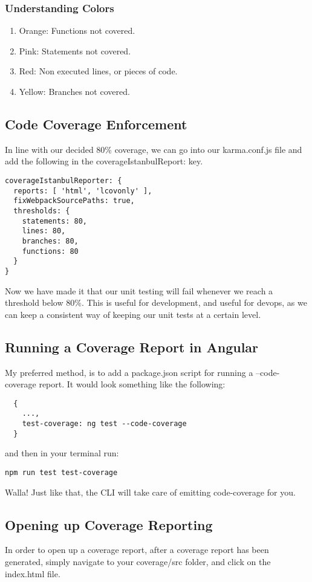 \subsubsection{Understanding Colors}
\begin{enumerate}
  \item Orange: Functions not covered.
  \item Pink: Statements not covered.
  \item Red: Non executed lines, or pieces of code.
  \item Yellow: Branches not covered.
\end{enumerate}

\subsection{ Code Coverage Enforcement }
In line with our decided 80\% coverage, we can go into our karma.conf.js file
and add the following in the coverageIstanbulReport: key.
\begin{lstlisting}
coverageIstanbulReporter: {
  reports: [ 'html', 'lcovonly' ],
  fixWebpackSourcePaths: true,
  thresholds: {
    statements: 80,
    lines: 80,
    branches: 80,
    functions: 80
  }
}
\end{lstlisting}
Now we have made it that our unit testing will fail whenever we reach a
threshold below 80\%. This is useful for development, and useful for devops, as
we can keep a consistent way of keeping our unit tests at a certain level.

\subsection{ Running a Coverage Report in Angular }
My preferred method, is to add a package.json script for running a
--code-coverage report. It would look something like the following:
\begin{verbatim}
  {
    ...,
    test-coverage: ng test --code-coverage
  }
\end{verbatim}

and then in your terminal run:
\begin{verbatim}
npm run test test-coverage
\end{verbatim}

Walla! Just like that, the CLI will take care of emitting code-coverage for you.

\subsection{ Opening up Coverage Reporting }
In order to open up a coverage report, after a coverage report has been
generated, simply navigate to your coverage/src folder, and click on the
index.html file.

